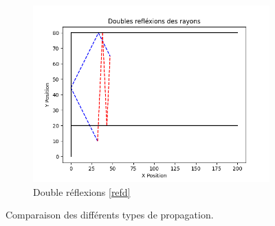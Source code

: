\begin{figure}[H]
\begin{subfigure}[b]{0.45\textwidth}
    \centering
    \includegraphics[width=\textwidth]{Pictures/double_reflex.png}
    \caption{Double réflexions \ref{refd}}
    \label{fig:double_reflection}
\end{subfigure}
\caption{Comparaison des différents types de propagation.}
\label{fig:ray_tracing}
\end{figure}

